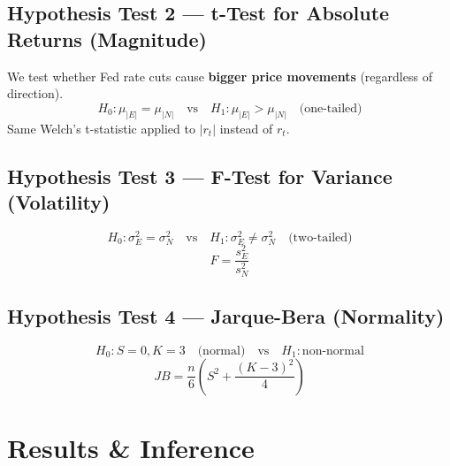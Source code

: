 \documentclass[12pt,a4paper]{article}
\begin{document}
\subsection{Hypothesis Test 2 --- t-Test for Absolute Returns (Magnitude)}
We test whether Fed rate cuts cause \textbf{bigger price movements} (regardless of direction).
\begin{equation*}
    H_0: \mu_{|E|} = \mu_{|N|} \quad \text{vs} \quad H_1: \mu_{|E|} > \mu_{|N|} \quad \text{(one-tailed)}
\end{equation*}
Same Welch's t-statistic applied to $|r_t|$ instead of $r_t$.

\subsection{Hypothesis Test 3 --- F-Test for Variance (Volatility)}
\begin{equation*}
    H_0: \sigma^2_E = \sigma^2_N \quad \text{vs} \quad H_1: \sigma^2_E \neq \sigma^2_N \quad \text{(two-tailed)}
\end{equation*}
\begin{equation*}
    F = \frac{s_E^2}{s_N^2}
\end{equation*}

\subsection{Hypothesis Test 4 --- Jarque-Bera (Normality)}
\begin{equation*}
    H_0: S = 0, K = 3 \quad \text{(normal)} \quad \text{vs} \quad H_1: \text{non-normal}
\end{equation*}
\begin{equation*}
    JB = \frac{n}{6} \left( S^2 + \frac{(K-3)^2}{4} \right)
\end{equation*}

\newpage
\section{Results \& Inference}
\end{document}
